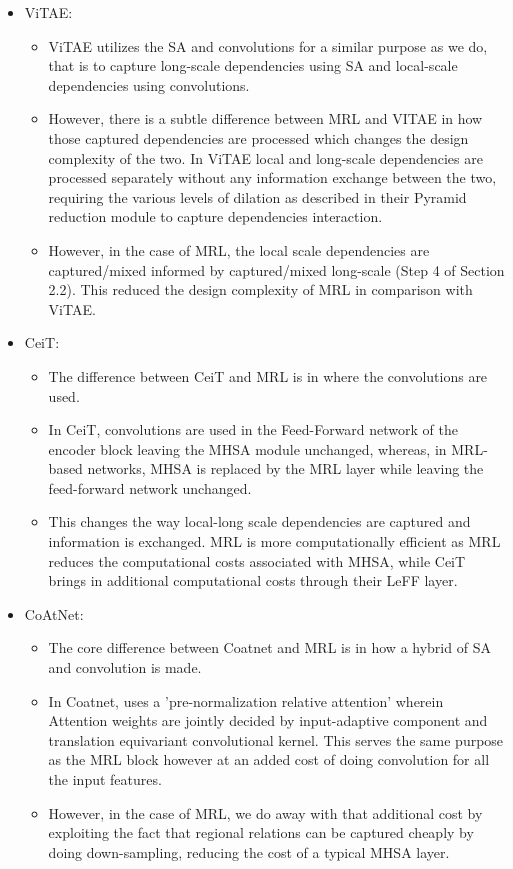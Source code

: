 \documentclass{article}
\begin{document}
\begin{itemize}
    \item ViTAE\cite{xu2021vitae}:
    \begin{itemize}
        \item ViTAE utilizes the SA and convolutions for a similar purpose as we do, that is to capture long-scale dependencies using SA and local-scale dependencies using convolutions.
        \item However, there is a subtle difference between MRL and VITAE in how those captured dependencies are processed which changes the design complexity of the two. In ViTAE local and long-scale dependencies are processed separately without any information exchange between the two, requiring the various levels of dilation as described in their Pyramid reduction module to capture dependencies interaction.
        \item However, in the case of MRL, the local scale dependencies are captured/mixed informed by captured/mixed long-scale (Step 4 of Section 2.2). This reduced the design complexity of MRL in comparison with ViTAE.
    \end{itemize}
    
    \item CeiT\cite{ceit}:
    \begin{itemize}
        \item The difference between CeiT and MRL is in where the convolutions are used.
        \item In CeiT, convolutions are used in the Feed-Forward network of the encoder block leaving the MHSA module unchanged, whereas, in MRL-based networks, MHSA is replaced by the MRL layer while leaving the feed-forward network unchanged.
        \item This changes the way local-long scale dependencies are captured and information is exchanged. MRL is more computationally efficient as MRL reduces the computational costs associated with MHSA, while CeiT brings in additional computational costs through their LeFF layer.
    \end{itemize}
    
    \item CoAtNet\cite{DBLP:journals/corr/CoAtNet}:
    \begin{itemize}
        \item The core difference between Coatnet and MRL is in how a hybrid of SA and convolution is made.
        \item In Coatnet, uses a 'pre-normalization relative attention' wherein Attention weights are jointly decided by input-adaptive component and translation equivariant convolutional kernel. This serves the same purpose as the MRL block however at an added cost of doing convolution for all the input features.
        \item However, in the case of MRL, we do away with that additional cost by exploiting the fact that regional relations can be captured cheaply by doing down-sampling, reducing the cost of a typical MHSA layer.
    \end{itemize}
    

\end{itemize}
\end{document}
